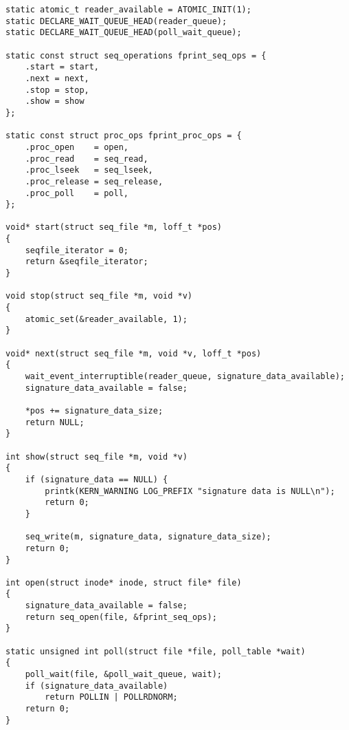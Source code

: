 \begin{lstlisting}[caption={функции работы с VFS proc}]
static atomic_t reader_available = ATOMIC_INIT(1);
static DECLARE_WAIT_QUEUE_HEAD(reader_queue);
static DECLARE_WAIT_QUEUE_HEAD(poll_wait_queue);

static const struct seq_operations fprint_seq_ops = {
    .start = start,
    .next = next,
    .stop = stop,
    .show = show
};

static const struct proc_ops fprint_proc_ops = {
    .proc_open    = open,
    .proc_read    = seq_read,
    .proc_lseek   = seq_lseek,
    .proc_release = seq_release,
    .proc_poll    = poll,
};

void* start(struct seq_file *m, loff_t *pos)
{
    seqfile_iterator = 0;
    return &seqfile_iterator;
}

void stop(struct seq_file *m, void *v)
{
    atomic_set(&reader_available, 1);
}

void* next(struct seq_file *m, void *v, loff_t *pos)
{
    wait_event_interruptible(reader_queue, signature_data_available);
    signature_data_available = false;

    *pos += signature_data_size;
    return NULL;
}

int show(struct seq_file *m, void *v)
{
    if (signature_data == NULL) {
        printk(KERN_WARNING LOG_PREFIX "signature data is NULL\n");
        return 0;
    }

    seq_write(m, signature_data, signature_data_size);
    return 0;
}

int open(struct inode* inode, struct file* file)
{
    signature_data_available = false;
    return seq_open(file, &fprint_seq_ops);
}

static unsigned int poll(struct file *file, poll_table *wait)
{
    poll_wait(file, &poll_wait_queue, wait);
    if (signature_data_available)
        return POLLIN | POLLRDNORM;
    return 0;
}
\end{lstlisting}
